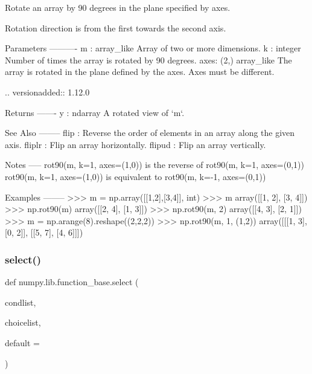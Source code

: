 \begin{DoxyVerb}Rotate an array by 90 degrees in the plane specified by axes.

Rotation direction is from the first towards the second axis.

Parameters
----------
m : array_like
    Array of two or more dimensions.
k : integer
    Number of times the array is rotated by 90 degrees.
axes: (2,) array_like
    The array is rotated in the plane defined by the axes.
    Axes must be different.

    .. versionadded:: 1.12.0

Returns
-------
y : ndarray
    A rotated view of `m`.

See Also
--------
flip : Reverse the order of elements in an array along the given axis.
fliplr : Flip an array horizontally.
flipud : Flip an array vertically.

Notes
-----
rot90(m, k=1, axes=(1,0)) is the reverse of rot90(m, k=1, axes=(0,1))
rot90(m, k=1, axes=(1,0)) is equivalent to rot90(m, k=-1, axes=(0,1))

Examples
--------
>>> m = np.array([[1,2],[3,4]], int)
>>> m
array([[1, 2],
       [3, 4]])
>>> np.rot90(m)
array([[2, 4],
       [1, 3]])
>>> np.rot90(m, 2)
array([[4, 3],
       [2, 1]])
>>> m = np.arange(8).reshape((2,2,2))
>>> np.rot90(m, 1, (1,2))
array([[[1, 3],
        [0, 2]],
       [[5, 7],
        [4, 6]]])\end{DoxyVerb}
 \mbox{\label{namespacenumpy_1_1lib_1_1function__base_add02c0e2aaaa517ff2b593caa51ffbab}} 
\subsubsection{\texorpdfstring{select()}{select()}}
{\footnotesize\ttfamily def numpy.\+lib.\+function\+\_\+base.\+select (\begin{DoxyParamCaption}\item[{}]{condlist,  }\item[{}]{choicelist,  }\item[{}]{default = {} }\end{DoxyParamCaption})}

